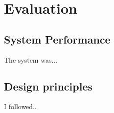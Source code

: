 \section{Evaluation}
\label{sec:evaluation}

\subsection{System Performance}
\label{subsec:system_performance}

The system was...


\subsection{Design principles}
\label{subsec:design_principles}

I followed..